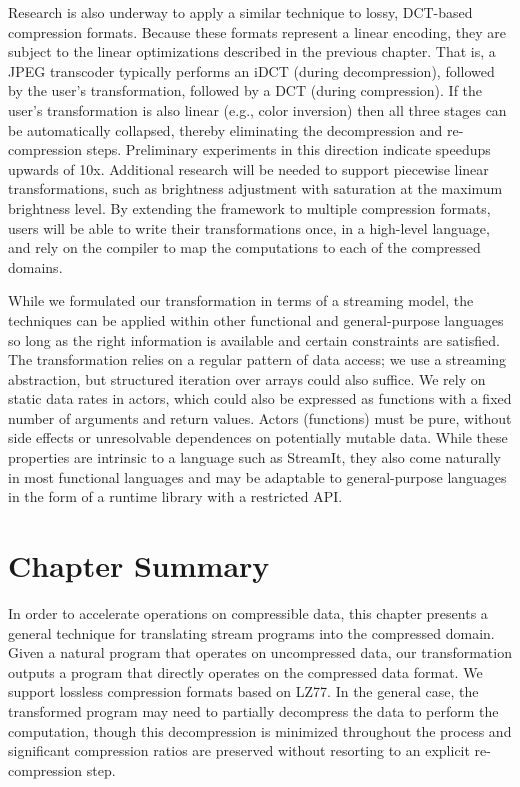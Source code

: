 Research is also underway to apply a similar technique to lossy,
DCT-based compression formats.  Because these formats represent a
linear encoding, they are subject to the linear optimizations
described in the previous chapter.  That is, a JPEG transcoder
typically performs an iDCT (during decompression), followed by the
user's transformation, followed by a DCT (during compression).  If the
user's transformation is also linear (e.g., color inversion) then all
three stages can be automatically collapsed, thereby eliminating the
decompression and re-compression steps.  Preliminary experiments in
this direction indicate speedups upwards of 10x.  Additional research
will be needed to support piecewise linear transformations, such as
brightness adjustment with saturation at the maximum brightness level.
By extending the framework to multiple compression formats, users will
be able to write their transformations once, in a high-level language,
and rely on the compiler to map the computations to each of the
compressed domains.

While we formulated our transformation in terms of a streaming model,
the techniques can be applied within other functional and
general-purpose languages so long as the right information is
available and certain constraints are satisfied.  The transformation
relies on a regular pattern of data access; we use a streaming
abstraction, but structured iteration over arrays could also suffice.
We rely on static data rates in actors, which could also be expressed
as functions with a fixed number of arguments and return values.
Actors (functions) must be pure, without side effects or unresolvable
dependences on potentially mutable data.  While these properties are
intrinsic to a language such as StreamIt, they also come naturally in
most functional languages and may be adaptable to general-purpose
languages in the form of a runtime library with a restricted API.

\section{Chapter Summary}


In order to accelerate operations on compressible data, this chapter
presents a general technique for translating stream programs into the
compressed domain.  Given a natural program that operates on
uncompressed data, our transformation outputs a program that directly
operates on the compressed data format.  We support lossless
compression formats based on LZ77.  In the general case, the
transformed program may need to partially decompress the data to
perform the computation, though this decompression is minimized
throughout the process and significant compression ratios are
preserved without resorting to an explicit re-compression step.

